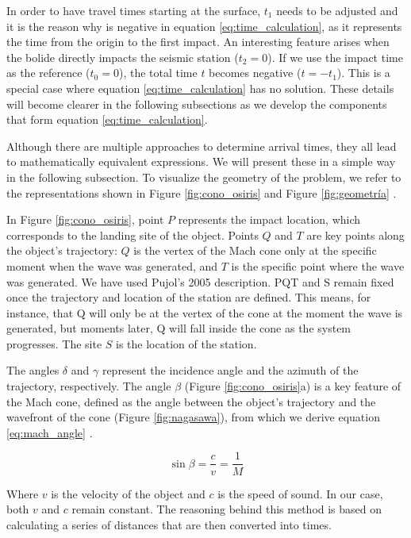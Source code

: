 \documentclass[linenum]{SSA-SRL}
\begin{document}
In order to have travel times starting at the surface, \( t_1 \) needs to be adjusted and it is the reason why is negative in equation \ref{eq:time_calculation}, as it represents the time from the origin to the first impact. An interesting feature arises when the bolide directly impacts the seismic station (\( t_2 = 0 \)). If we use the impact time as the reference (\( t_0 = 0 \)), the total time \( t \) becomes negative (\( t = -t_1 \)). This is a special case where equation \ref{eq:time_calculation} has no solution. These details will become clearer in the following subsections as we develop the components that form equation \ref{eq:time_calculation}.
 
 Although there are multiple approaches to determine arrival times, they all lead to mathematically equivalent expressions. We will present these in a simple way in the following subsection. To visualize the geometry of the problem, we refer to the representations shown in Figure \ref{fig:cono_osiris} and Figure \ref{fig:geometría} \citep{Pujol_2005}.

In Figure \ref{fig:cono_osiris}, point \( P \) represents the impact location, which corresponds to the landing site of the object. Points \( Q \) and \( T \) are key points along the object's trajectory: \( Q \) is the vertex of the Mach cone only at the specific moment when the wave was generated, and \( T \) is the specific point where the wave was generated. We have used   Pujol's  2005 description. PQT and S remain fixed once the trajectory and location of the station are defined. This means, for instance, that Q will only be at the vertex of the cone at the moment the wave is generated, but moments later, Q will fall inside the cone as the system progresses.  The site \( S \) is the location of the station.

The angles \( \delta \) and \( \gamma \) represent the incidence angle and the azimuth of the trajectory, respectively. The angle \( \beta \) (Figure \ref{fig:cono_osiris}a) is a key feature of the Mach cone, defined as the angle between the object's trajectory and the wavefront of the cone (Figure \ref{fig:nagasawa}), from which we derive equation \ref{eq:mach_angle} \citep{maccoll__1937}.

\begin{equation}
\sin \beta = \frac{c}{v} = \frac{1}{M}
\label{eq:mach_angle}
\end{equation}

Where \( v \) is the velocity of the object and \( c \) is the speed of sound. In our case, both \( v \) and \( c \) remain constant. The reasoning behind this method is based on calculating a series of distances that are then converted into times. 
\end{document}
